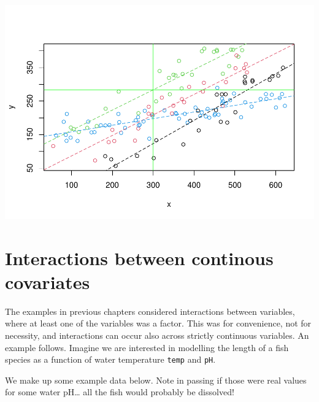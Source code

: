 \documentclass[
]{book}
\begin{document}
\includegraphics{ECOMODbook_files/figure-latex/a11.27-1.pdf}

\hypertarget{ContinousInteractions}{%
\chapter{Interactions between continous covariates}\label{ContinousInteractions}}

The examples in previous chapters considered interactions between variables, where at least one of the variables was a factor. This was for convenience, not for necessity, and interactions can occur also across strictly continuous variables. An example follows. Imagine we are interested in modelling the length of a fish species as a function of water temperature \texttt{temp} and \texttt{pH}.

We make up some example data below. Note in passing if those were real values for some water pH\ldots{} all the fish would probably be dissolved!
\end{document}
